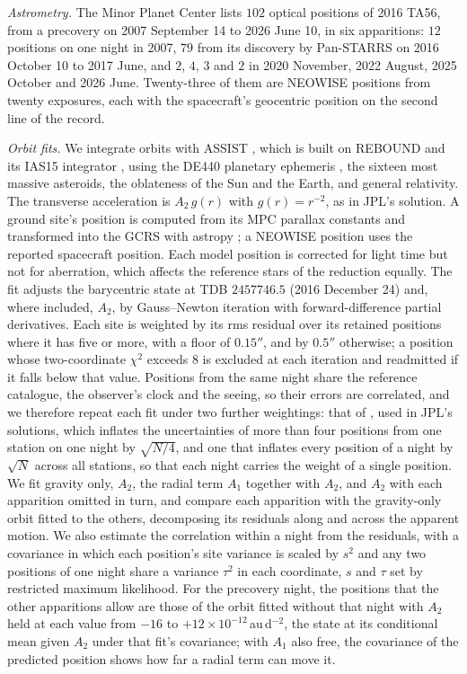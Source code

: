 \documentclass[3p,11pt]{elsarticle}
\begin{document}
\emph{Astrometry.} The Minor Planet Center lists $102$ optical positions of 2016 TA56,
from a precovery on 2007 September 14 to 2026 June 10, in six apparitions: $12$
positions on one night in 2007, $79$ from its discovery by Pan-STARRS on 2016 October 10
to 2017 June, and $2$, $4$, $3$ and $2$ in 2020 November, 2022 August, 2025 October and
2026 June. Twenty-three of them are NEOWISE positions from twenty exposures, each with the
spacecraft's geocentric position on the second line of the record.

\emph{Orbit fits.} We integrate orbits with ASSIST \citep{Holman2023}, which is built on
REBOUND \citep{Rein2012} and its IAS15 integrator \citep{Rein2015}, using the DE440
planetary ephemeris \citep{Park2021}, the sixteen most massive asteroids, the oblateness of
the Sun and the Earth, and general relativity. The transverse acceleration is
$A_2\,g(r)$ with $g(r)=r^{-2}$, as in JPL's solution. A ground site's position is computed
from its MPC parallax constants and transformed into the GCRS with
astropy \citep{Astropy2022}; a NEOWISE position uses the reported spacecraft position. Each
model position is corrected for light time but not for aberration, which affects the
reference stars of the reduction equally. The fit adjusts the barycentric state at TDB
$2457746.5$ (2016 December 24) and, where included, $A_2$, by Gauss--Newton iteration
with forward-difference partial derivatives. Each site is weighted by its rms residual
over its retained positions where it has five or more, with a floor of $0.15''$, and by
$0.5''$ otherwise; a position whose two-coordinate $\chi^2$ exceeds $8$ is excluded at
each iteration and readmitted if it falls below that value. Positions from the same night
share the reference catalogue, the observer's clock and the seeing, so their errors are
correlated, and we therefore repeat each fit under two further weightings: that of
\citet{Veres2017}, used in JPL's solutions, which inflates the
uncertainties of more than four positions from one station on one night by $\sqrt{N/4}$,
and one that inflates every position of a night by $\sqrt{N}$ across all stations, so
that each night carries the weight of a single position. We fit gravity only, $A_2$, the
radial term $A_1$ together with $A_2$, and $A_2$ with each apparition omitted in turn, and
compare each apparition with the gravity-only orbit fitted to the others, decomposing its
residuals along and across the apparent motion. We also estimate the correlation within a
night from the residuals, with a covariance in which each position's site variance is
scaled by $s^2$ and any two positions of one night share a variance $\tau^2$ in each
coordinate, $s$ and $\tau$ set by restricted maximum likelihood. For the precovery night,
the positions that the other apparitions allow are those of the orbit fitted without that
night with $A_2$ held at each value from $-16$ to $+12\times10^{-12}$\,au\,d$^{-2}$, the
state at its conditional mean given $A_2$ under that fit's covariance; with $A_1$ also free,
the covariance of the predicted position shows how far a radial term can move it.
\end{document}

